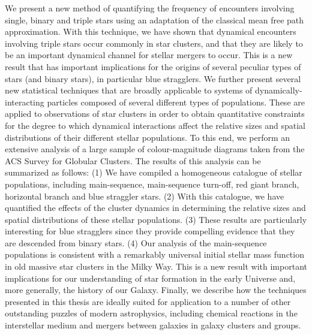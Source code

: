 We present a new method of quantifying the frequency of encounters
involving single, binary and triple stars using an adaptation of the
classical mean free path approximation.  With this technique, we have
shown that dynamical encounters involving triple stars occur commonly
in star clusters, and that they are likely to be an important
dynamical channel 
for stellar mergers to occur.  This is a new result that has important
implications for the origins of several peculiar types of stars (and
binary stars), in
particular blue stragglers.  We further present several new
statistical techniques that are broadly applicable to systems of
dynamically-interacting particles composed of several different types
of populations.  These are applied to observations of star clusters in
order to obtain quantitative constraints for the degree to 
which dynamical interactions affect the relative sizes and spatial
distributions of their different stellar populations.  To this end, 
we perform an extensive analysis of a large sample of colour-magnitude
diagrams taken from the ACS Survey for Globular Clusters.  The results
of this analysis can be summarized as follows:  (1) We have compiled a
homogeneous catalogue of stellar populations, including main-sequence,
main-sequence turn-off, red giant branch, horizontal branch and blue
straggler stars.  (2) With this catalogue, we have quantified the
effects of the cluster dynamics in determining the relative sizes
and spatial distributions of these stellar populations.  (3) These
results are particularly interesting for blue stragglers since they
provide compelling evidence that they are descended from binary stars.
(4) Our analysis of the main-sequence populations is consistent with 
a remarkably universal initial stellar mass function in old massive
star clusters in the Milky Way.  This is a new result with 
important implications for our understanding of star formation in the
early Universe and, 
more generally, the history of our Galaxy.  Finally, we describe how
the techniques presented in this thesis are ideally suited for
application to a number of other outstanding puzzles of modern
astrophysics, including chemical reactions in the interstellar medium
and mergers between galaxies in galaxy clusters and groups.  


\newpage
\thispagestyle{empty}
\mbox{}

